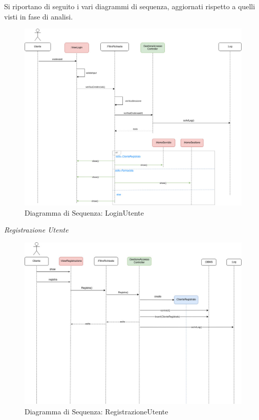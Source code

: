 Si riportano di seguito i vari diagrammi di sequenza, aggiornati rispetto a quelli visti in fase di analisi.

\vspace{3em}

\begin{figure}[h!]
    \begin{center}
        \includegraphics[width=\textwidth]{immagini/Interazione-LoginUtente-progettaz.jpg}
        \caption{Diagramma di Sequenza: LoginUtente}
    \end{center}
\end{figure}

\newpage

\textit{Registrazione Utente}

\begin{figure}[h!]
    \begin{center}
        \includegraphics[width=\textwidth]{immagini/Interazione-RegistrazioneUtente-progettaz.jpg}
        \caption{Diagramma di Sequenza: RegistrazioneUtente}
    \end{center}
\end{figure}

